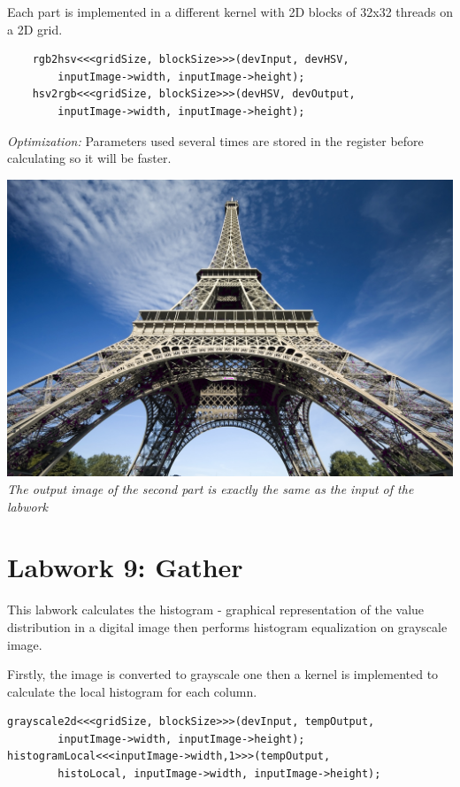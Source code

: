 \documentclass{article}
\begin{document}
Each part is implemented in a different kernel with 2D blocks of 32x32 threads on a 2D grid.

\begin{lstlisting}
    rgb2hsv<<<gridSize, blockSize>>>(devInput, devHSV, 
        inputImage->width, inputImage->height);
    hsv2rgb<<<gridSize, blockSize>>>(devHSV, devOutput, 
        inputImage->width, inputImage->height);
\end{lstlisting}

\textit{Optimization:} Parameters used several times are stored in the register before calculating so it will be faster. \\

\begin{center}
    \includegraphics[width=\linewidth]{labwork8-gpu-out.jpg}
    \\
    \textit{The output image of the second part is exactly the same as the input of the labwork}
\end{center}

\section{Labwork 9: Gather}
This labwork calculates the histogram - graphical representation of the value distribution in a digital image then performs histogram equalization on grayscale image. 

Firstly, the image is converted to grayscale one then a kernel is implemented to calculate the local histogram for each column. 

\begin{lstlisting}
grayscale2d<<<gridSize, blockSize>>>(devInput, tempOutput,
        inputImage->width, inputImage->height);
histogramLocal<<<inputImage->width,1>>>(tempOutput, 
        histoLocal, inputImage->width, inputImage->height);
\end{lstlisting}
\end{document}
